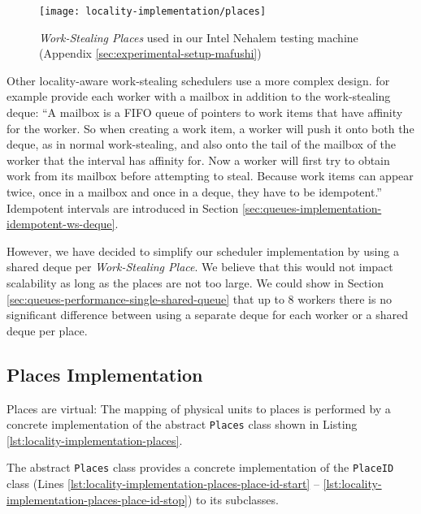 \begin{figure}[!ht]
  \centering
  \texttt{[image: locality-implementation/places]}
  \caption[\emph{Work-Stealing Places}]{\emph{Work-Stealing Places}
    used in our Intel Nehalem testing machine (Appendix
    \ref{sec:experimental-setup-mafushi})}
  \label{fig:locality-implementation-work-stealing-places}
\end{figure}

Other locality-aware work-stealing schedulers use a more complex
design. \textcite{Acar2000} for example provide each worker with a
mailbox in addition to the work-stealing deque: ``A mailbox is a FIFO
queue of pointers to work items that have affinity for the worker. So
when creating a work item, a worker will push it onto both the deque,
as in normal work-stealing, and also onto the tail of the mailbox of
the worker that the interval has affinity for. Now a worker will first
try to obtain work from its mailbox before attempting to
steal. Because work items can appear twice, once in a mailbox and once
in a deque, they have to be idempotent.'' Idempotent intervals are
introduced in Section
\ref{sec:queues-implementation-idempotent-ws-deque}.

However, we have decided to simplify our scheduler implementation by
using a shared deque per \emph{Work-Stealing Place}. We believe that
this would not impact scalability as long as the places are not too
large. We could show in Section
\ref{sec:queues-performance-single-shared-queue} that up to 8 workers
there is no significant difference between using a separate deque for
each worker or a shared deque per place.

\subsection{Places Implementation}
\label{sec:locality-implementation-work-stealing-places-implementation}

Places are virtual: The mapping of physical units to places is
performed by a concrete implementation of the abstract
\lstinline!Places! class shown in Listing
\ref{lst:locality-implementation-places}.



The abstract \lstinline!Places! class provides a concrete
implementation of the \lstinline!PlaceID! class (Lines
\ref{lst:locality-implementation-places-place-id-start} --
\ref{lst:locality-implementation-places-place-id-stop}) to its
subclasses. 

